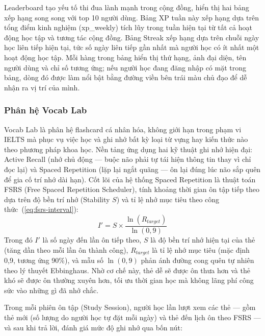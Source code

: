 Leaderboard tạo yếu tố thi đua lành mạnh trong cộng đồng, hiển thị hai bảng xếp hạng song song với top 10 người dùng. Bảng XP tuần này xếp hạng dựa trên tổng điểm kinh nghiệm (xp\_weekly) tích lũy trong tuần hiện tại từ tất cả hoạt động học tập và tương tác cộng đồng. Bảng Streak xếp hạng dựa trên chuỗi ngày học liên tiếp hiện tại, tức số ngày liên tiếp gần nhất mà người học có ít nhất một hoạt động học tập. Mỗi hàng trong bảng hiển thị thứ hạng, ảnh đại diện, tên người dùng và chỉ số tương ứng; nếu người học đang đăng nhập có mặt trong bảng, dòng đó được làm nổi bật bằng đường viền bên trái màu chủ đạo để dễ nhận ra vị trí của mình.

\subsubsection{Phân hệ Vocab Lab}

Vocab Lab là phân hệ flashcard cá nhân hóa, không giới hạn trong phạm vi IELTS mà phục vụ việc học và ghi nhớ bất kỳ loại từ vựng hay kiến thức nào theo phương pháp khoa học. Nền tảng ứng dụng hai kỹ thuật ghi nhớ hiện đại: Active Recall (nhớ chủ động --- buộc não phải tự tái hiện thông tin thay vì chỉ đọc lại) và Spaced Repetition (lặp lại ngắt quãng --- ôn lại đúng lúc não sắp quên để gia cố trí nhớ dài hạn). Cốt lõi của hệ thống Spaced Repetition là thuật toán FSRS (Free Spaced Repetition Scheduler), tính khoảng thời gian ôn tập tiếp theo dựa trên độ bền trí nhớ (Stability $S$) và tỉ lệ nhớ mục tiêu theo công thức~(\ref{eq:fsrs-interval}):
\begin{equation}
    I' = S \times \dfrac{\ln(R_{target})}{\ln(0{,}9)}
    \label{eq:fsrs-interval}
\end{equation}
Trong đó $I'$ là số ngày đến lần ôn tiếp theo, $S$ là độ bền trí nhớ hiện tại của thẻ (tăng dần theo mỗi lần ôn thành công), $R_{target}$ là tỉ lệ nhớ mục tiêu (mặc định 0{,}9, tương ứng 90\%), và mẫu số $\ln(0{,}9)$ phản ánh đường cong quên tự nhiên theo lý thuyết Ebbinghaus. Nhờ cơ chế này, thẻ dễ sẽ được ôn thưa hơn và thẻ khó sẽ được ôn thường xuyên hơn, tối ưu thời gian học mà không lãng phí công sức vào những gì đã nhớ chắc.

Trong mỗi phiên ôn tập (Study Session), người học lần lượt xem các thẻ --- gồm thẻ mới (số lượng do người học tự đặt mỗi ngày) và thẻ đến lịch ôn theo FSRS --- và sau khi trả lời, đánh giá mức độ ghi nhớ qua bốn nút:

